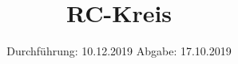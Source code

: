 

\subject{353 }
\title{RC-Kreis}
\date{%
  Durchführung: 10.12.2019
  \hspace{3em}
  Abgabe: 17.10.2019
}



\maketitle
\thispagestyle{empty}
\tableofcontents
\newpage







\printbibliography{}


